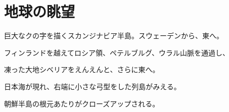 \section*{地球の眺望}

巨大なクの字を描くスカンジナビア半島。スウェーデンから、東へ。

フィンランドを越えてロシア領、ペテルブルグ、ウラル山脈を通過し、

凍った大地シベリアをえんえんと、さらに東へ。

日本海が現れ、右端に小さな弓型をした列島がみえる。

朝鮮半島の根元あたりがクローズアップされる。
